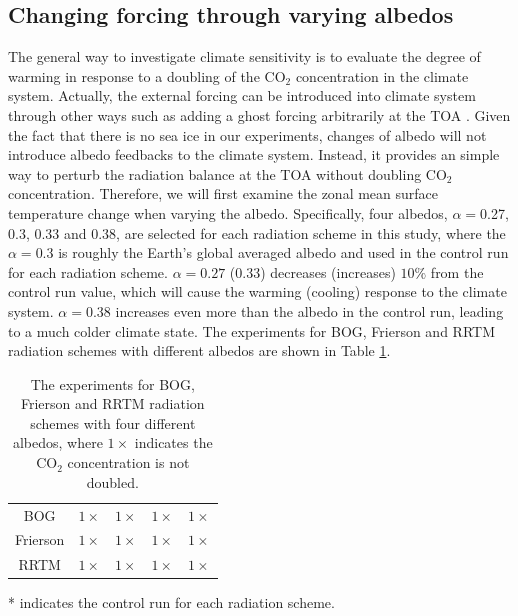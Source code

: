

\subsection{Changing forcing through varying albedos}
The general way to investigate climate sensitivity is to evaluate the degree of warming in response to a doubling of the CO$_2$ concentration in the climate system. Actually, the external forcing can be introduced into climate system through other ways such as adding a ghost forcing  arbitrarily at the TOA \citep{Hansen1997,Alexeev2005}. Given the fact that there is no sea ice in our experiments, changes of albedo will not introduce albedo feedbacks to the climate system. Instead, it provides an simple way to perturb the radiation balance at the TOA without doubling CO$_2$ concentration. Therefore, we will first examine the zonal mean surface temperature change when varying the albedo. Specifically, four albedos, $\alpha=$0.27, 0.3, 0.33 and 0.38, are selected for each radiation scheme in this study, where the $\alpha = 0.3$ is roughly the Earth's global averaged albedo and used in the control run for each radiation scheme. $\alpha=0.27$ (0.33) decreases (increases) $10\%$ from the control run value, which will cause the warming (cooling) response to the climate system. $\alpha=0.38$ increases even more than the albedo in the control run, leading to a much colder climate state. The experiments for BOG, Frierson and RRTM radiation schemes with different albedos are shown in Table \ref{tab:exp_table}.

\begin{table}[ht]
	\centering
	\caption{The experiments for BOG, Frierson and RRTM radiation schemes with four different albedos, where $1\times$ indicates the CO$_2$ concentration is not doubled.} %
	\begin{tabular}{c|*{4}{c}}
		\hline		%
		\diagbox{Scheme}{Albedo} &\makebox[3em]{0.38}&\makebox[3em]{0.33}&\makebox[3em]{0.3$^*$}
		&\makebox[3em]{0.27}\\
		\hline %
		BOG &  $1\times$ & $1\times$ & $1\times$& $1\times$ \\
		Frierson & $1\times$ & $1\times$ & $1\times$ & $1\times$ \\ 
		RRTM & $1\times$ & $1\times$ & $1\times$ & $1\times$ \\
		\hline%
	\end{tabular}%

	* indicates the control run for each radiation scheme.
	\label{tab:exp_table}
\end{table}

